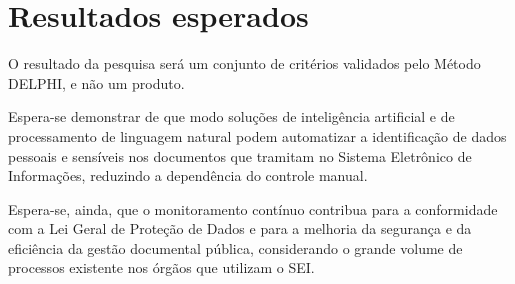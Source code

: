 
\section{Resultados esperados}

O resultado da pesquisa será um conjunto de critérios validados pelo Método
DELPHI, e não um produto.

Espera-se demonstrar de que modo soluções de inteligência artificial e de
processamento de linguagem natural podem automatizar a identificação de dados
pessoais e sensíveis nos documentos que tramitam no Sistema Eletrônico de
Informações, reduzindo a dependência do controle manual.

Espera-se, ainda, que o monitoramento contínuo contribua para a conformidade
com a Lei Geral de Proteção de Dados e para a melhoria da segurança e da
eficiência da gestão documental pública, considerando o grande volume de
processos existente nos órgãos que utilizam o SEI.
